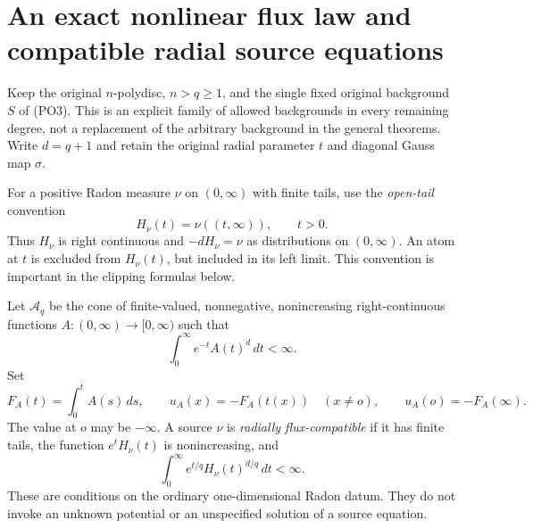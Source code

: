 \section{An exact nonlinear flux law and compatible radial source equations}
\label{sec:r12-radial-flux-source-inversion}

Keep the original $n$-polydisc, $n>q\ge1$, and the single
fixed original background $S$ of \textup{(PO3)}.  This is
an explicit family of allowed backgrounds in every remaining
degree, not a replacement of the arbitrary background in the
general theorems.  Write $d=q+1$ and retain the original
radial parameter $t$ and diagonal Gauss map $\sigma$.

For a positive Radon measure $\nu$ on $(0,\infty)$ with
finite tails, use the \emph{open-tail} convention
\[
 H_\nu(t)=\nu((t,\infty)),\qquad t>0.
 \tag{RF1}
\]
Thus $H_\nu$ is right continuous and $-dH_\nu=\nu$
as distributions on $(0,\infty)$.  An atom at $t$ is
excluded from $H_\nu(t)$, but included in its left limit.
This convention is important in the clipping formulas below.

\begin{definition}
\label{def:r12-radial-admissible-flux}
Let $\mathscr A_q$ be the cone of finite-valued,
nonnegative, nonincreasing right-continuous functions
$A:(0,\infty)\to[0,\infty)$ such that
\[
                 \int_0^\infty e^{-t}A(t)^d\,dt<\infty.
 \tag{RF2}
\]
Set
\[
 F_A(t)=\int_0^t A(s)\,ds,\qquad
 u_A(x)=-F_A(t(x))\quad(x\ne o),\qquad
 u_A(o)=-F_A(\infty).
 \tag{RF3}
\]
The value at $o$ may be $-\infty$.  A source $\nu$ is
\emph{radially flux-compatible} if it has finite tails,
the function $e^tH_\nu(t)$ is nonincreasing, and
\[
              \int_0^\infty e^{t/q}H_\nu(t)^{d/q}\,dt<\infty.
 \tag{RF4}
\]
These are conditions on the ordinary one-dimensional
Radon datum.  They do not invoke an unknown potential
or an unspecified solution of a source equation.
\end{definition}

